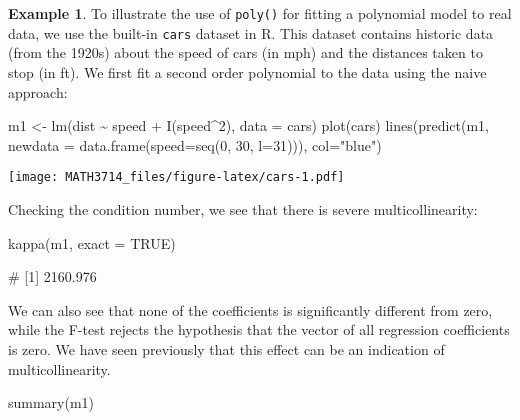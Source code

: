 \documentclass[
  a4paper,
]{article}
\newenvironment{Shaded}{\begin{snugshade}}{\end{snugshade}}
\newcommand{\AttributeTok}[1]{\textcolor[rgb]{0.77,0.63,0.00}{#1}}
\newcommand{\ConstantTok}[1]{\textcolor[rgb]{0.00,0.00,0.00}{#1}}
\newcommand{\DecValTok}[1]{\textcolor[rgb]{0.00,0.00,0.81}{#1}}
\newcommand{\FunctionTok}[1]{\textcolor[rgb]{0.00,0.00,0.00}{#1}}
\newcommand{\NormalTok}[1]{#1}
\newcommand{\OtherTok}[1]{\textcolor[rgb]{0.56,0.35,0.01}{#1}}
\newcommand{\SpecialCharTok}[1]{\textcolor[rgb]{0.00,0.00,0.00}{#1}}
\newcommand{\StringTok}[1]{\textcolor[rgb]{0.31,0.60,0.02}{#1}}
\theoremstyle{definition}
\theoremstyle{definition}
\newtheorem{example}{Example}[section]
\theoremstyle{definition}
\theoremstyle{definition}
\theoremstyle{remark}
\begin{document}
\begin{example}

To illustrate the use of \texttt{poly()} for fitting a polynomial model to
real data, we use the built-in \texttt{cars} dataset in R. This dataset
contains historic data (from the 1920s) about the speed of cars (in mph) and
the distances taken to stop (in ft). We first fit a second order polynomial
to the data using the naive approach:

\begin{Shaded}
\begin{Highlighting}[]
\NormalTok{m1 }\OtherTok{\textless{}{-}} \FunctionTok{lm}\NormalTok{(dist }\SpecialCharTok{\textasciitilde{}}\NormalTok{ speed }\SpecialCharTok{+} \FunctionTok{I}\NormalTok{(speed}\SpecialCharTok{\^{}}\DecValTok{2}\NormalTok{), }\AttributeTok{data =}\NormalTok{ cars)}
\FunctionTok{plot}\NormalTok{(cars)}
\FunctionTok{lines}\NormalTok{(}\FunctionTok{predict}\NormalTok{(m1, }\AttributeTok{newdata =} \FunctionTok{data.frame}\NormalTok{(}\AttributeTok{speed=}\FunctionTok{seq}\NormalTok{(}\DecValTok{0}\NormalTok{, }\DecValTok{30}\NormalTok{, }\AttributeTok{l=}\DecValTok{31}\NormalTok{))),}
      \AttributeTok{col=}\StringTok{"blue"}\NormalTok{)}
\end{Highlighting}
\end{Shaded}

\texttt{[image: MATH3714\_files/figure-latex/cars-1.pdf]}

Checking the condition number, we see that there is severe multicollinearity:

\begin{Shaded}
\begin{Highlighting}[]
\FunctionTok{kappa}\NormalTok{(m1, }\AttributeTok{exact =} \ConstantTok{TRUE}\NormalTok{)}
\end{Highlighting}
\end{Shaded}

\begin{Shaded}
\begin{Highlighting}[]
\NormalTok{\# [1] 2160.976}
\end{Highlighting}
\end{Shaded}

We can also see that none of the coefficients is significantly different from
zero, while the F-test rejects the hypothesis that the vector of all regression
coefficients is zero. We have seen previously that this effect can be an
indication of multicollinearity.

\begin{Shaded}
\begin{Highlighting}[]
\FunctionTok{summary}\NormalTok{(m1)}
\end{Highlighting}
\end{Shaded}


\end{example}
\end{document}
